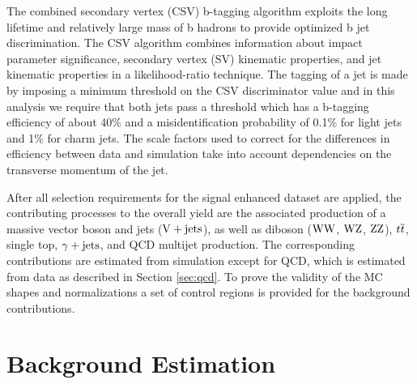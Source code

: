 The combined secondary vertex (CSV) b-tagging algorithm \cite{CMS-PAS-BTV-13-001,cmsBTAGPAPER} exploits
 the long lifetime and relatively large mass of b hadrons to provide optimized
 b jet discrimination.
The CSV algorithm combines information about impact parameter
 significance, secondary vertex (SV) kinematic properties, and jet kinematic
 properties in a likelihood-ratio technique.
The tagging of a jet is made by imposing a minimum threshold on
 the CSV discriminator value and in this analysis we require
 that both jets pass a threshold which has a b-tagging
 efficiency of about 40\% and a misidentification probability of
 0.1\% for light jets and 1\% for charm jets.
The scale factors used to correct for the differences in efficiency
 between data and simulation take into account dependencies on
 the transverse momentum of the jet.

After all selection requirements for the signal enhanced dataset are applied,
 the contributing processes to the overall yield are the
 associated production of a massive vector boson and jets ($\mathrm{V}+\mathrm{jets}$),
 as well as diboson ($\mathrm{W}\mathrm{W}$, $\mathrm{W}\mathrm{Z}$, $\mathrm{Z}\mathrm{Z}$), $t\overline{t}$, single top, $\gamma+\mathrm{jets}$, and QCD multijet production.
The corresponding contributions are estimated from simulation except for QCD, which
 is estimated from data as described in Section \ref{sec:qcd}.
To prove the validity of the MC shapes and normalizations a set of control regions is 
 provided for the background contributions.

\section{Background Estimation}

